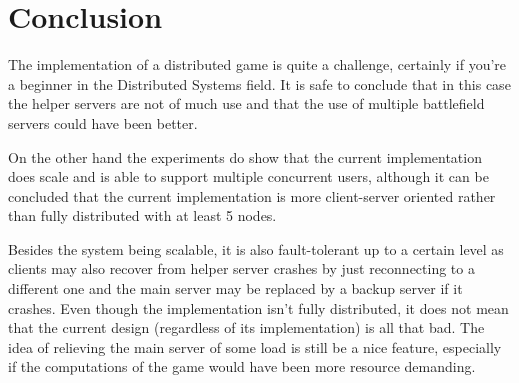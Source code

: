 \section{Conclusion}
The implementation of a distributed game is quite a challenge, certainly if you're a beginner in the Distributed Systems field. 
It is safe to conclude that in this case the helper servers are not of much use and that the use of multiple battlefield servers could have been better.

On the other hand the experiments do show that the current implementation does scale and is able to support multiple concurrent users, although it can be concluded that the current implementation is more client-server oriented rather than fully distributed with at least 5 nodes.

Besides the system being scalable, it is also fault-tolerant up to a certain level as clients may also recover from helper server crashes by just reconnecting to a different one and the main server may be replaced by a backup server if it crashes.
Even though the implementation isn't fully distributed, it does not mean that the current design (regardless of its implementation) is all that bad. 
The idea of relieving the main server of some load is still be a nice feature, especially if the computations of the game would have been more resource demanding. 

